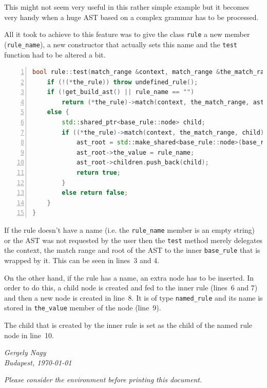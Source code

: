 \documentclass[12pt]{article}
\begin{document}
This might not seem very useful in this rather simple example but it becomes very handy when a huge AST based
on a complex grammar has to be processed.

All it took to achieve to this feature was to give the class \texttt{rule} a new member (\texttt{rule\_name}),
a new constructor that actually sets this name and the \texttt{test} function had to be altered a bit.

\begin{center}
	\begin{minipage}[ht]{0.9\textwidth}
		\begin{lstlisting}[language=C++, breaklines=true, numbers=left]
bool rule::test(match_range &context, match_range &the_match_range, std::shared_ptr<base_rule::node> &ast_root) {
	if (!(*the_rule)) throw undefined_rule();
	if (!get_build_ast() || rule_name == "")
		return (*the_rule)->match(context, the_match_range, ast_root);
	else {
		std::shared_ptr<base_rule::node> child;
		if ((*the_rule)->match(context, the_match_range, child)) {
			ast_root = std::make_shared<base_rule::node>(base_rule::node::type::named_rule);
			ast_root->the_value = rule_name;
			ast_root->children.push_back(child);
			return true;
		}
		else return false;
	}
}
		\end{lstlisting}
	\end{minipage}
\end{center}

If the rule doesn't have a name (i.e. the \texttt{rule\_name} member is an empty string) or the AST was not
requested by the user then the \texttt{test} method merely delegates the context, the match range and root of
the AST to the inner \texttt{base\_rule} that is wrapped by it. This can be seen in lines~3 and 4. 

On the other hand, if the rule has a name, an extra node has to be inserted. In order to do this, a child node
is created and fed to the inner rule (lines~6 and 7) and then a new node is created in line~8. It is of type
\texttt{named\_rule} and its name is stored in \texttt{the\_value} member of the node (line~9).

The child that is created by the inner rule is set as the child of the named rule node in line~10.
\vfill
\vfill
\vfill
\hfill\begin{minipage}[h]{0.3\textwidth}
\begin{center}
	\textit{Gergely Nagy}\\
	\textit{Budapest, \today}
\end{center}
\end{minipage}
\vfill

\newpage \tableofcontents

\vfill
\vfill
\begin{center}
\footnotesize\emph{Please consider the environment before printing this document.}
\end{center}
\vfill
\end{document}

